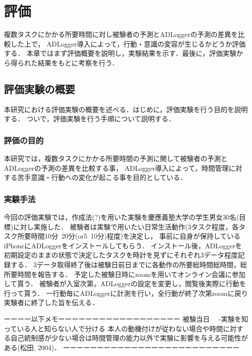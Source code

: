 \chapter{評価}
複数タスクにかかる所要時間に対し被験者の予測とADLoggerの予測の差異を比較した上で，
ADLogger導入によって，行動・意識の変容が生じるかどうか評価する．
本章ではまず評価概要を説明し，実験結果を示す．最後に，評価実験から得られた結果をもとに考察を行う．

\section{評価実験の概要}
本研究における評価実験の概要を述べる．はじめに，評価実験を行う目的を説明する．
ついで，評価実験を行う手順について説明する．

\subsection{評価の目的}
本研究では，複数タスクにかかる所要時間の予測に関して被験者の予測とADLoggerの予測の差異を比較する事，
ADLogger導入によって，時間管理に対する苦手意識・行動への変化が起こる事を目的としている．

\subsection{実験手法}%
今回の評価実験では，作成法\cite{Oguro1961}\cite{Tayama2018}(?)を用いた実験を慶應義塾大学の学生男女30名(目標)に対し実施した．
被験者は実験で用いたい日常生活動作(3タスク程度，各タスク所要時間10分~20分(or5~10分)程度)を決定し，
事前に自身が保持しているiPhoneにADLoggerをインストールしてもらう．
インストール後，ADLoggerを初期設定のままの状態で決定したタスクを時計を見ずにそれぞれ3データ程度記録する．
3データ取得終了後は被験日前日までに各動作の所要総時間総時間，総所要時間を報告する．
予定した被験日時にzoom\cite{zoom}を用いてオンライン会議に参加して貰う．
被験者が入室次第，ADLoggerの設定を変更し，閲覧後実際に行動を行って貰う．
一行動毎にADLoggerに計測を行い，全行動が終了次第zoomに戻り実験者に終了した旨を伝える．

ーーーー以下メモーーーーーーーーーーーーーーーーーー
被験当日
　-実験を知っている人と知らない人で分ける
本人の動機付けが従わない場合や時間に対する自己統制感が少ない場合は時間管理の能力以外で実験に影響を与える可能性がある(松田, 2004)．
ーーーーーーーーーーーーーーーーーーーーーーーーーー

